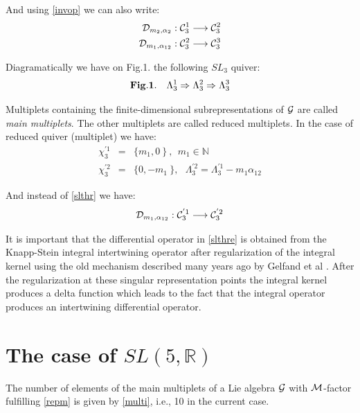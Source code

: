 \documentclass[a4paper]{jpconf}
\def\beq{\begin{equation}}
\def\eqn#1{\beq\label{#1}}
\def\ee{\end{equation}}
\def\np{\newpage}
\def\bb {\begin {eqnarray}}
\def\eqnn#1{\bb\label{#1}}
\def\eea {\end {eqnarray}}
\def\nn{\nonumber}
\def\np{\vfill\eject}
\def\lra{\longrightarrow}
\def\bbr{\mathbb{R}}%
\def\bbn{\mathbb{N}}%
\def\a{\alpha}
\def\cd{{\cal D}} \def\ce{{\cal E}} \def\cf{{\cal F}}
\def\cg{{\cal G}} \def\ch{{\cal H}} \def\ci{{\cal I}}
\def\cm{{\cal M}} \def\cn{{\cal N}} \def\co{{\cal O}}
\def\ido{intertwining differential operator}
\def\L{\Lambda}
\begin{document}
And using \eqref{invop} we can also write:
\eqnn{slthr}  \cd_{m_2,\a_2} : \cc^1_3 \lra \cc^2_3 \\
\cd_{m_1,\a_{12}} : \cc^2_3 \lra \cc^3_3 \nn\eea



Diagramatically we have on Fig.1. the following $SL_3$ quiver:
\eqn{qui3} {\bf Fig.1.} ~~~\L^1_3 \Rightarrow \L^2_3 \Rightarrow \L^3_3 \ee

Multiplets containing the finite-dimensional subrepresentations of $\cg$ are called {\it main multiplets}.
 The other multiplets are called reduced multiplets.
 In the case of reduced quiver (multiplet) we have:
\eqnn{slthr}
\chi^{'1}_3 &=& \{ m_1, 0 \   \} \ , ~~m_1 \in\bbn \\
 \chi^{'2}_3 &=& \{ 0, -m_{1}\ \}, ~~~\L^{'2}_3 = \L^{'1}_3 - m_1 \a_{12} \nn\eea

And instead of  \eqref{slthr} we have:
 \eqn{slthre} \cd_{m_1,\a_{12}} : \cc^{'1}_3 \lra \cc^{'2}_3 \ee

 It is important that the differential operator in \eqref{slthre} is obtained from the Knapp-Stein integral intertwining  operator after regularization
 of the integral kernel using the old mechanism described many years ago by Gelfand et al \cite{GeV}. After the regularization at these singular representation
 points the integral kernel produces a delta function which leads to the fact that the integral operator produces an \ido{}.



















\section{The case of $SL(5,\bbr)$}


 The number of elements of the main multiplets   of a
  Lie algebra $\cg$ with $\cm$-factor fulfilling \eqref{repm}
is given by \eqref{multi}, i.e., 10 in the current case.

\end{document}
